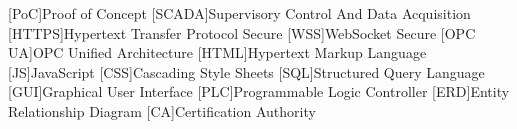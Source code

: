 \begin{multicols}{2}
  \begin{acronym}
  [PoC]{Proof of Concept}
  [SCADA]{Supervisory Control And Data Acquisition}
  [HTTPS]{Hypertext Transfer Protocol Secure}
  [WSS]{WebSocket Secure}
  [OPC UA]{OPC Unified Architecture}
  [HTML]{Hypertext Markup Language}
  [JS]{JavaScript}
  [CSS]{Cascading Style Sheets}
  [SQL]{Structured Query Language}
  [GUI]{Graphical User Interface}
  [PLC]{Programmable Logic Controller}
  [ERD]{Entity Relationship Diagram}
  [CA]{Certification Authority}
\end{acronym}
\end{multicols}
